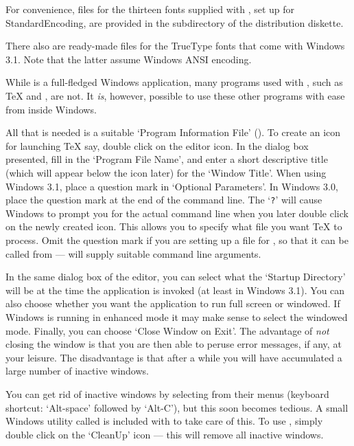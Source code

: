 For convenience, {\TFM} files for the thirteen fonts supplied with {\ATM},
set up for StandardEncoding,
are provided in the  subdirectory of the
{\DVIWindo} distribution diskette.

\unvpar

There also are ready-made {\TFM} files for the True\-Type fonts that
come with Windows 3.1.
Note that the latter assume Windows ANSI encoding. %



While {\DVIWindo} is a full-fledged Windows application, many programs
used with {\DVIWindo}, such as {\TeX} and {\DVIPSONE}, are not.
It {\it is\/}, however, possible to use these other programs with ease
from inside Windows.

All that is needed is a suitable `Program Information File' ({\PIF}).  
To create an icon for launching {\TeX} say,
double click on the {\PIF} editor icon.  
In the dialog box presented, fill in the `Program File Name', and 
enter a short descriptive title (which will appear below the icon later)
for the `Window Title'.
When using Windows 3.1, place a question mark in `Optional Parameters'.
In Windows 3.0, place the question mark at the end of the command line.
The `{\tt ?}' will cause Windows to prompt you for the actual command line
when you later double click on the newly created icon.
This allows you to specify what file you want {\TeX} to process.
Omit the question mark if you are setting up a {\PIF} file for {\DVIPSONE},
so that it can be called from {\DVIWindo} --- {\DVIWindo} will supply
suitable command line arguments.

In the same dialog box of the {\PIF} editor,
you can select what the `Startup Directory'
will be at the time the application is invoked (at least in Windows 3.1).
You can also choose whether you want the application to run full screen
or windowed.  
If Windows is running in enhanced mode it may make sense to select
the windowed mode.   
Finally, you can choose `Close Window on Exit'.
The advantage of {\it not} closing the window is that you are then able
to peruse error messages, if any, at your leisure.  
The disadvantage is that after a
while you will have accumulated a large number of inactive windows.

You can get rid of inactive windows by selecting  from their
 menus (keyboard shortcut: `Alt-space' followed by
`Alt-C'), but this soon becomes tedious.  
A small Windows utility called {\CLEANUP} is included with {\DVIWindo}
to take care of this. 
To use {\CLEANUP}, simply double click on the `CleanUp' icon --- this
will remove all inactive windows. 

